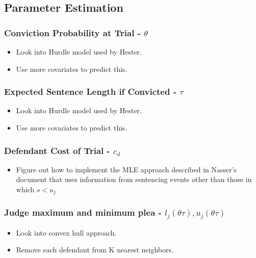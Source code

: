 \documentclass[11pt]{article}
\begin{document}
  \subsection{Parameter Estimation}
    \subsubsection{Conviction Probability at Trial - $\theta$}
      \begin{itemize}
        \item Look into Hurdle model used by Hester.
        \item Use more covariates to predict this.
      \end{itemize}

    \subsubsection{Expected Sentence Length if Convicted - $\tau$}
      \begin{itemize}
        \item Look into Hurdle model used by Hester.
        \item Use more covariates to predict this.
      \end{itemize}

    \subsubsection{Defendant Cost of Trial - $c_d$}
      \begin{itemize}
        \item Figure out how to implement the MLE approach described in Nasser's document
        that uses information from sentencing events other than those in which $s < u_j$
      \end{itemize}

    \subsubsection{Judge maximum and minimum plea - $l_j(\theta \tau),u_j(\theta \tau)$}
      \begin{itemize}
        \item Look into convex hull approach.
        \item Remove each defendant from K nearest neighbors.
      \end{itemize}
\end{document}
